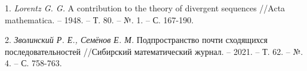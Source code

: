 \litlist

1. {\it Lorentz G. G.} 
A contribution to the theory of divergent sequences //Acta mathematica. – 1948. – Т. 80. – №. 1. – С. 167-190.

2. {\it Зволинский Р. Е., Семёнов Е. М.} 
Подпространство почти сходящихся последовательностей //Сибирский математический журнал. – 2021. – Т. 62. – №. 4. – С. 758-763.
